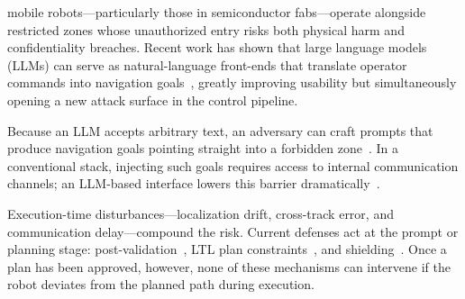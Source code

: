 \documentclass[conference]{IEEEtran}
\begin{document}
 mobile robots---particularly those in semiconductor fabs---operate alongside restricted zones whose unauthorized entry risks both physical harm and confidentiality breaches. Recent work has shown that large language models (LLMs) can serve as natural-language front-ends that translate operator commands into navigation goals~\cite{ahn2023do,liang2023code,singh2023progprompt,huang2023inner,huang2022language}, greatly improving usability but simultaneously opening a new attack surface in the control pipeline.

Because an LLM accepts arbitrary text, an adversary can craft prompts that produce navigation goals pointing straight into a forbidden zone~\cite{perez2022ignore,greshake2023not,robey2025jailbreaking}. In a conventional stack, injecting such goals requires access to internal communication channels; an LLM-based interface lowers this barrier dramatically~\cite{yaacoub2022robotics}.

Execution-time disturbances---localization drift, cross-track error, and communication delay---compound the risk. Current defenses act at the prompt or planning stage: post-validation~\cite{yang2024plug}, LTL plan constraints~\cite{wu2025selp}, and shielding~\cite{alshiekh2018safe}. Once a plan has been approved, however, none of these mechanisms can intervene if the robot deviates from the planned path during execution.
\end{document}
